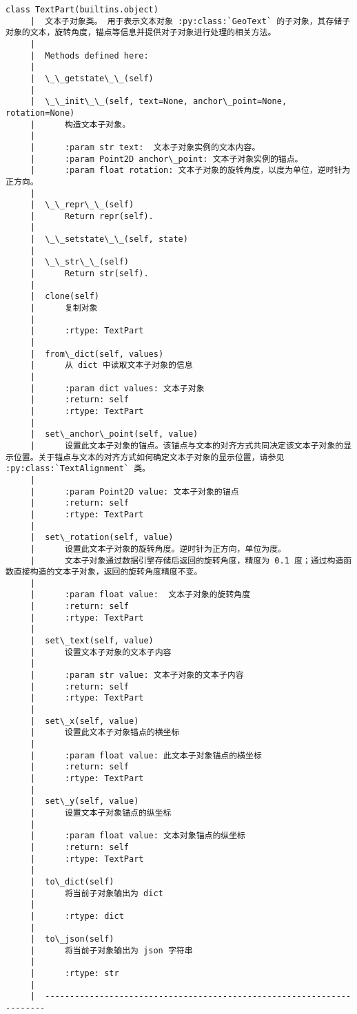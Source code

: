 \documentclass[11pt]{article}
\begin{document}
\begin{Verbatim}[commandchars=\\\{\}]
    class TextPart(builtins.object)
     |  文本子对象类。 用于表示文本对象 :py:class:`GeoText` 的子对象，其存储子对象的文本，旋转角度，锚点等信息并提供对子对象进行处理的相关方法。
     |  
     |  Methods defined here:
     |  
     |  \_\_getstate\_\_(self)
     |  
     |  \_\_init\_\_(self, text=None, anchor\_point=None, rotation=None)
     |      构造文本子对象。
     |      
     |      :param str text:  文本子对象实例的文本内容。
     |      :param Point2D anchor\_point: 文本子对象实例的锚点。
     |      :param float rotation: 文本子对象的旋转角度，以度为单位，逆时针为正方向。
     |  
     |  \_\_repr\_\_(self)
     |      Return repr(self).
     |  
     |  \_\_setstate\_\_(self, state)
     |  
     |  \_\_str\_\_(self)
     |      Return str(self).
     |  
     |  clone(self)
     |      复制对象
     |      
     |      :rtype: TextPart
     |  
     |  from\_dict(self, values)
     |      从 dict 中读取文本子对象的信息
     |      
     |      :param dict values: 文本子对象
     |      :return: self
     |      :rtype: TextPart
     |  
     |  set\_anchor\_point(self, value)
     |      设置此文本子对象的锚点。该锚点与文本的对齐方式共同决定该文本子对象的显示位置。关于锚点与文本的对齐方式如何确定文本子对象的显示位置，请参见 :py:class:`TextAlignment` 类。
     |      
     |      :param Point2D value: 文本子对象的锚点
     |      :return: self
     |      :rtype: TextPart
     |  
     |  set\_rotation(self, value)
     |      设置此文本子对象的旋转角度。逆时针为正方向，单位为度。
     |      文本子对象通过数据引擎存储后返回的旋转角度，精度为 0.1 度；通过构造函数直接构造的文本子对象，返回的旋转角度精度不变。
     |      
     |      :param float value:  文本子对象的旋转角度
     |      :return: self
     |      :rtype: TextPart
     |  
     |  set\_text(self, value)
     |      设置文本子对象的文本子内容
     |      
     |      :param str value: 文本子对象的文本子内容
     |      :return: self
     |      :rtype: TextPart
     |  
     |  set\_x(self, value)
     |      设置此文本子对象锚点的横坐标
     |      
     |      :param float value: 此文本子对象锚点的横坐标
     |      :return: self
     |      :rtype: TextPart
     |  
     |  set\_y(self, value)
     |      设置文本子对象锚点的纵坐标
     |      
     |      :param float value: 文本对象锚点的纵坐标
     |      :return: self
     |      :rtype: TextPart
     |  
     |  to\_dict(self)
     |      将当前子对象输出为 dict
     |      
     |      :rtype: dict
     |  
     |  to\_json(self)
     |      将当前子对象输出为 json 字符串
     |      
     |      :rtype: str
     |  
     |  ----------------------------------------------------------------------

\end{Verbatim}
\end{document}
